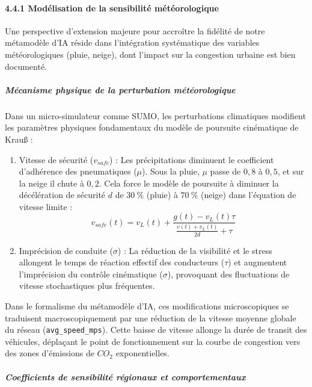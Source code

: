 \documentclass[10pt, a4paper]{article}
\providecommand{\tightlist}{}
\begin{document}
\paragraph{4.4.1 Modélisation de la sensibilité
météorologique}\label{moduxe9lisation-de-la-sensibilituxe9-muxe9tuxe9orologique}

Une perspective d'extension majeure pour accroître la fidélité de notre
métamodèle d'IA réside dans l'intégration systématique des variables
météorologiques (pluie, neige), dont l'impact sur la congestion urbaine
est bien documenté.

\subparagraph{Mécanisme physique de la perturbation
météorologique}\label{muxe9canisme-physique-de-la-perturbation-muxe9tuxe9orologique}

Dans un micro-simulateur comme SUMO, les perturbations climatiques
modifient les paramètres physiques fondamentaux du modèle de poursuite
cinématique de Krauß :

\begin{enumerate}
\def\labelenumi{\arabic{enumi}.}
\tightlist
\item
  Vitesse de sécurité (\(v_{safe}\)) : Les précipitations diminuent le
  coefficient d'adhérence des pneumatiques (\(\mu\)). Sous la pluie,
  \(\mu\) passe de \(0,8\) à \(0,5\), et sur la neige il chute à
  \(0,2\). Cela force le modèle de poursuite à diminuer la décélération
  de sécurité \(d\) de \(30\ \%\) (pluie) à \(70\ \%\) (neige) dans
  l'équation de vitesse limite :
  \[v_{safe}(t) = v_L(t) + \frac{g(t) - v_L(t)\tau}{\frac{v(t) + v_L(t)}{2d} + \tau}\]
\item
  Imprécision de conduite (\(\sigma\)) : La réduction de la visibilité
  et le stress allongent le temps de réaction effectif des conducteurs
  (\(\tau\)) et augmentent l'imprécision du contrôle cinématique
  (\(\sigma\)), provoquant des fluctuations de vitesse stochastiques
  plus fréquentes.
\end{enumerate}

Dans le formalisme du métamodèle d'IA, ces modifications microscopiques
se traduisent macroscopiquement par une réduction de la vitesse moyenne
globale du réseau (\texttt{avg\_speed\_mps}). Cette baisse de vitesse
allonge la durée de transit des véhicules, déplaçant le point de
fonctionnement sur la courbe de congestion vers des zones d'émissions de
\(CO_2\) exponentielles.

\subparagraph{Coefficients de sensibilité régionaux et
comportementaux}\label{coefficients-de-sensibilituxe9-ruxe9gionaux-et-comportementaux}
\end{document}
